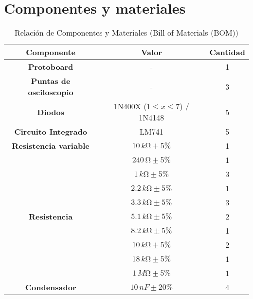 
\section{Componentes y materiales}

\begin{table}[H]
    \centering
    \begin{tabular}{|c|c|c|}
        \hline
        \textbf{Componente} & \textbf{Valor} & \textbf{Cantidad} \\\hline
        \textbf{Protoboard} & - & 1 \\\hline
        \textbf{Puntas de osciloscopio} & - & 3 \\\hline
        \textbf{Diodos} & 1N400X ($1\leq x \leq 7$) / 1N4148 & 5 \\\hline
        \textbf{Circuito Integrado} & LM741 & 5 \\\hline
        \textbf{Resistencia variable} & $10 \, k  \si{\ohm}\pm5 \%$ & 1 \\\hline
        \multirow{9}{5cm}{\centering \textbf{Resistencia}}
        & $240 \, \si{\ohm}\pm5\%$ & 1 \\
        & $1 \, k  \si{\ohm}\pm5\%$ & 3 \\
        & $2.2 \, k  \si{\ohm}\pm5\%$ & 1 \\
        & $3.3 \, k  \si{\ohm}\pm5\%$ & 3 \\
        & $5.1 \, k  \si{\ohm}\pm5\%$ & 2 \\
        & $8.2 \, k  \si{\ohm}\pm5\%$ & 1 \\
        & $10 \, k  \si{\ohm}\pm5\%$ & 2 \\
        & $18 \, k  \si{\ohm}\pm5\%$ & 1 \\
        & $1 \, M  \si{\ohm}\pm5\%$ & 1 \\\hline
        \textbf{Condensador}& $10 \,  nF\pm20\%$ & 4 \\\hline
    \end{tabular}
    \caption{Relación de Componentes y Materiales (Bill of Materials (BOM))}
    \label{tab:componentes}
\end{table}



\newpage